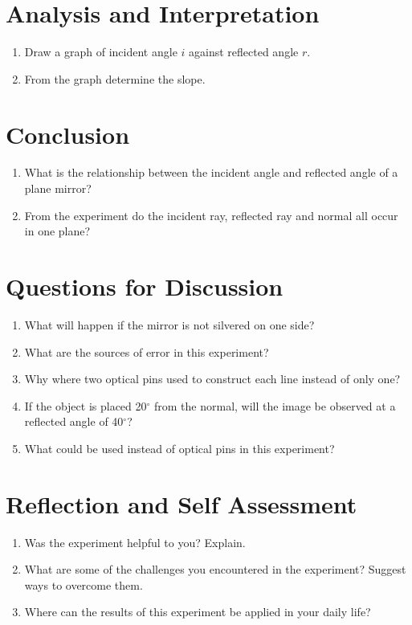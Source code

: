 \section{Analysis and Interpretation}
\begin{enumerate}
\item Draw a graph of incident angle $i$ against reflected angle $r$.
\item From the graph determine the slope.
\end{enumerate}

\section{Conclusion}
\begin{enumerate}
\item What is the relationship between the incident angle and reflected angle of a plane mirror?
\item From the experiment do the incident ray, reflected ray and normal all occur in one plane? 
\end{enumerate}

\section{Questions for Discussion}
\begin{enumerate}
\item What will happen if the mirror is not silvered on one side?
\item What are the sources of error in this experiment?
\item Why where two optical pins used to construct each line instead of only one?
\item If the object is placed 20$^\circ$ from the normal, will the image be observed at a reflected angle of 40$^\circ$?
\item What could be used instead of optical pins in this experiment?
\end{enumerate}

\section{Reflection and Self Assessment}
\begin{enumerate}
\item Was the experiment helpful to you? Explain.
\item What are some of the challenges you encountered in the experiment? Suggest ways to overcome them.
\item Where can the results of this experiment be applied in your daily life? 
\end{enumerate}
